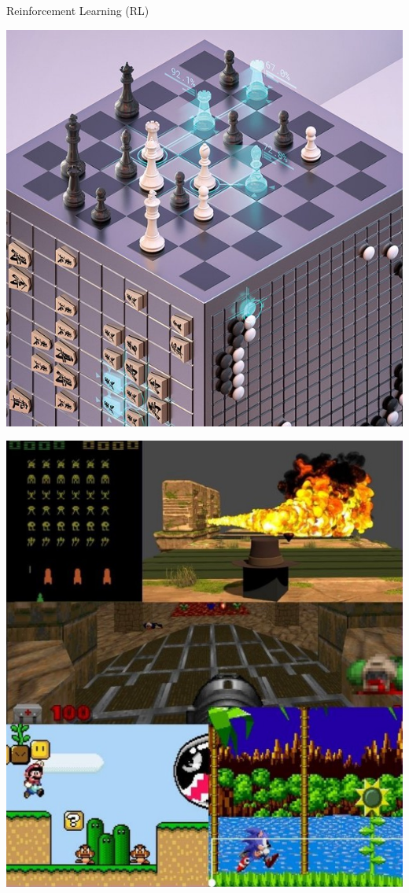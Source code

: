 \documentclass[aspectratio=1610]{beamer}
\begin{document}
\begin{frame}{Reinforcement Learning (RL)}
\begin{itemize}
\begin{minipage}[c]{0.19\textwidth}
			\includegraphics[width=\linewidth]{graphics/alphazero.png}
		\end{minipage}
		\begin{minipage}[c]{0.19\textwidth}
				\includegraphics[width=\linewidth]{graphics/compgames.jpg}
			\end{minipage}
			

\end{itemize}
\end{frame}
\end{document}
